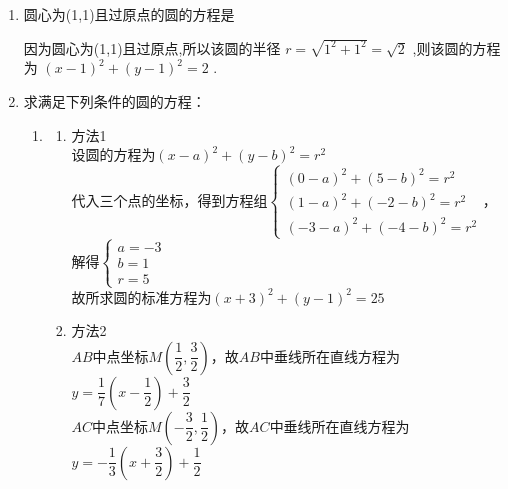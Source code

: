 \begin{enumerate}
    \item 圆心为(1,1)且过原点的圆的方程是

    \begin{jieda}
        因为圆心为(1,1)且过原点,所以该圆的半径 $r = \sqrt{{1}^{2} + {1}^{2}} = \sqrt{2}$ ,则该圆的方程为 ${\left( x - 1\right) }^{2} + {\left( y - 1\right) }^{2} = 2$ .
    \end{jieda}
    
    \item 求满足下列条件的圆的方程：
    \begin{jieda}
        \begin{enumerate}
            \item 
            \begin{enumerate}
                \item 方法1 \\
                设圆的方程为$(x-a)^2+(y-b)^2 = r^2$ \\
                代入三个点的坐标，得到方程组$\left\{\begin{array}{l}
                     (0-a)^2+(5-b)^2 = r^2  \\
                     (1-a)^2+(-2-b)^2 = r^2  \\
                     (-3-a)^2+(-4-b)^2 = r^2
                \end{array}\right.$，解得$\left\{\begin{array}{l}
                     a = -3  \\
                     b = 1  \\
                     r = 5
                \end{array}\right.$ \\
                故所求圆的标准方程为$(x+3)^2+(y-1)^2=25$
                \item 方法2 \\
                $AB$中点坐标$M\left(\dfrac{1}{2}, \dfrac{3}{2}\right)$，故$AB$中垂线所在直线方程为$y = \dfrac{1}{7}\left(x - \dfrac{1}{2}\right)+\dfrac{3}{2}$ \\
                $AC$中点坐标$M\left(-\dfrac{3}{2}, \dfrac{1}{2}\right)$，故$AC$中垂线所在直线方程为$y = -\dfrac{1}{3}\left(x + \dfrac{3}{2}\right)+\dfrac{1}{2}$ \\

\end{enumerate}
\end{enumerate}
\end{jieda}
\end{enumerate}
